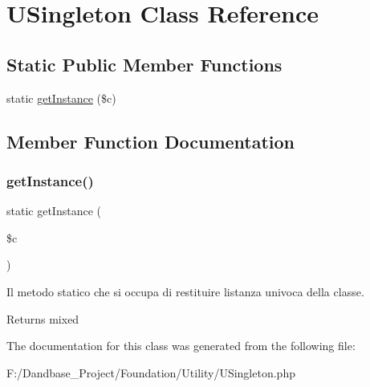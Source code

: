 \hypertarget{class_u_singleton}{}\section{U\+Singleton Class Reference}
\label{class_u_singleton}
\subsection*{Static Public Member Functions}
\begin{DoxyCompactItemize}
\item 
static \mbox{\hyperlink{class_u_singleton_a280a34147beea137ea38ae3168560f11}{get\+Instance}} (\$c)
\end{DoxyCompactItemize}


\subsection{Member Function Documentation}
\mbox{\label{class_u_singleton_a280a34147beea137ea38ae3168560f11}} 
\subsubsection{\texorpdfstring{get\+Instance()}{getInstance()}}
{\footnotesize\ttfamily static get\+Instance (\begin{DoxyParamCaption}\item[{}]{\$c }\end{DoxyParamCaption})\hspace{0.3cm}{\ttfamily [static]}}

Il metodo statico che si occupa di restituire l\textquotesingle{}istanza univoca della classe.

\begin{DoxyReturn}{Returns}
mixed 
\end{DoxyReturn}


The documentation for this class was generated from the following file\+:\begin{DoxyCompactItemize}
\item 
F\+:/\+Dandbase\+\_\+\+Project/\+Foundation/\+Utility/U\+Singleton.\+php\end{DoxyCompactItemize}
